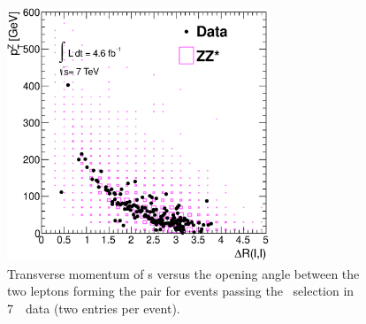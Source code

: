  \begin{figure}[htbp]
 \begin{center}
  \includegraphics[width=0.7\textwidth]{7TeV/h_dr_ptz}\hfill
  \caption[Transverse momentum of \leppair s versus the opening angle between the two leptons
    forming the pair for events passing the \ZZs\ selection in 7~\tev\ data.]
    {\small Transverse momentum of  \leppair s versus the opening angle between the two leptons
    forming the pair for events passing the \ZZs\ selection in 7~\tev\ data (two
    entries per event).}
 \label{fig:zzdists-dr-ptz-seven}
 \end{center}
 \end{figure}


